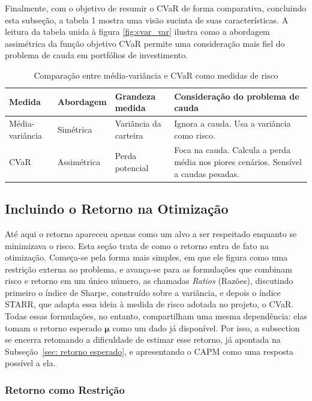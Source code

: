 \documentclass[12pt,a4paper]{article}
\begin{document}
Finalmente, com o objetivo de resumir o CVaR de forma comparativa, concluindo esta subseção, a tabela 1 mostra uma visão sucinta de suas características. A leitura da tabela unida à figura \ref{fig:cvar_var} ilustra como a abordagem assimétrica da função objetivo CVaR permite uma consideração mais fiel do problema de cauda em portfólios de investimento.

\begin{table}[H]
\centering
\caption{Comparação entre média-variância e CVaR como medidas de risco}
\label{tab:sharpe_cvar}
\begin{tabular}{@{}p{2.0cm}p{2.2cm}p{3.5cm}p{7.5cm}@{}}
\toprule
\textbf{Medida} & \textbf{Abordagem} & \textbf{Grandeza medida} & \textbf{Consideração do problema de cauda} \\
\midrule
Média-variância & Simétrica & Variância da carteira & Ignora a cauda. Usa a variância como risco. \\
\addlinespace
CVaR & Assimétrica & Perda potencial & Foca na cauda. Calcula a perda média nos piores cenários. Sensível a caudas pesadas. \\
\bottomrule
\end{tabular}
\end{table}



\subsection{Incluindo o Retorno na Otimização}

Até aqui o retorno apareceu apenas como um alvo a ser respeitado enquanto se minimizava o risco. Esta seção trata de como o retorno entra de fato na otimização. Começa-se pela forma mais simples, em que ele figura como uma restrição externa ao problema, e avança-se para as formulações que combinam risco e retorno em um único número, as chamadas \textit{Ratios} (Razões), discutindo primeiro o índice de Sharpe, construído sobre a variância, e depois o índice STARR, que adapta essa ideia à medida de risco adotada no projeto, o CVaR. Todas essas formulações, no entanto, compartilham uma mesma dependência: elas tomam o retorno esperado $\boldsymbol{\mu}$ como um dado já disponível. Por isso, a subsection se encerra retomando a dificuldade de estimar esse retorno, já apontada na Subseção~\ref{sec: retorno esperado}, e apresentando o CAPM como uma resposta possível a ela.

\subsubsection{Retorno como Restrição}
\end{document}
